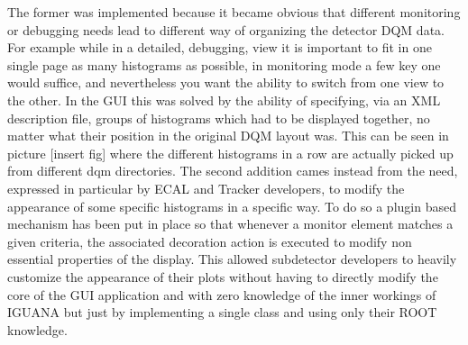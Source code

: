 \documentclass[a4paper]{cmspaper}
\begin{document}
The former was implemented because it became obvious that different monitoring or debugging needs lead to different way of organizing the detector DQM data. For example while in a detailed, debugging, view it is important to fit in one single page as many histograms as possible, in monitoring mode a few key one would suffice, and nevertheless you want the ability to switch from one view to the other. In the GUI this was solved by the ability of specifying, via an XML description file, groups of histograms which had to be displayed together, no matter what their position in the original DQM layout was. This can be seen in picture [insert fig] where the different histograms in a row are actually picked up from different dqm directories.
The second addition cames instead from the need, expressed in particular by ECAL and Tracker developers, to modify the appearance of some specific histograms in a specific way. To do so a plugin based mechanism has been put in place so that whenever a monitor element matches a given criteria, the associated decoration action is executed to modify non essential properties of the display. This allowed subdetector developers to heavily customize the appearance of their plots without having to directly modify the core of the GUI application and with zero knowledge of the inner workings of IGUANA but just by implementing a single class and using only their ROOT knowledge.
\end{document}
